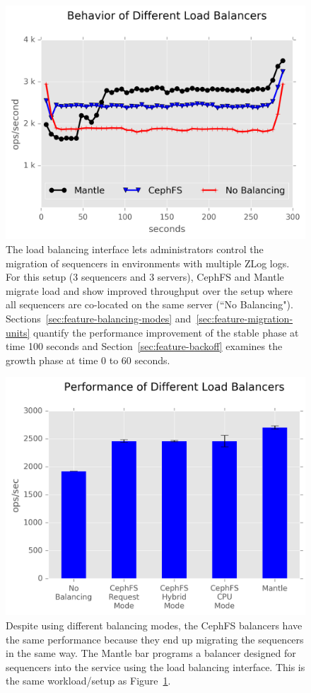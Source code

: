 \documentclass[preprint]{sigplanconf-eurosys}
\begin{document}
\begin{figure}[t!]
\centering
\includegraphics{figures/mantle-balancer-behaviors.png}
\caption{The load balancing interface lets administrators control the migration
of sequencers in environments with multiple ZLog logs. For this setup (3
sequencers and 3 servers), CephFS and Mantle migrate load and show improved
throughput over the setup where all sequencers are co-located on the same
server (``No Balancing").  Sections~\ref{sec:feature-balancing-modes}
and~\ref{sec:feature-migration-units} quantify the performance improvement of
the stable phase at time 100 seconds and Section~\ref{sec:feature-backoff}
examines the growth phase at time 0 to 60 seconds.
}\label{fig:mantle-balancer-behaviors}
\end{figure}

\begin{figure}[t!]
\centering
\includegraphics{figures/mantle-balancer-performance.png}
\caption{Despite using different balancing modes, the CephFS balancers have the
same performance because they end up migrating the sequencers in the same way.
The Mantle bar programs a balancer designed for sequencers into the service
using the load balancing interface. This is the same workload/setup as
Figure~\ref{fig:mantle-balancer-behaviors}.}\label{fig:mantle-balancer-performance}
\end{figure}
\end{document}
